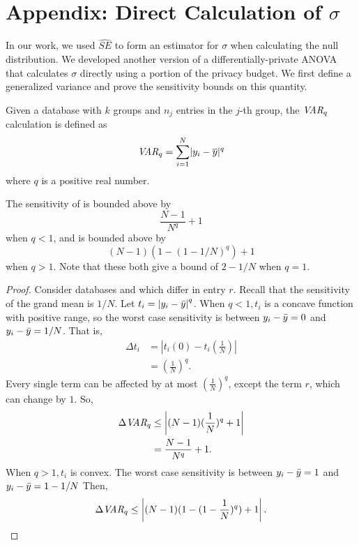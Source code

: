 
\section{Appendix: Direct Calculation of $\sigma$}
\label{Sec:AppDirSig}

In our work, we used $\widehat{SE}$ to form an estimator for $\sigma$ when calculating the null distribution.  We developed another version of a differentially-private ANOVA that calculates $\sigma$ directly using a portion of the privacy budget.  We first define a generalized variance and prove the sensitivity bounds on this quantity.

\begin{definition}[$\var_q$] \label{def:varq} Given a database \x with $k$ groups and $n_j$ entries in the $j$-th group, the $\var_q$ calculation is defined as
\begin{equation*}
\textit{VAR}_q = \sum_{i=1}^N \lvert y_{i} - \overline{y} \rvert^q
\end{equation*}
where $q$ is a positive real number.
\end{definition}

\begin{theorem} \label{thm:varqSens} 
The sensitivity of \varq is bounded above by
$$ \frac{N-1}{N^q} + 1 $$
when $q<1$, and is bounded above by
$$ (N-1)(1-(1-1/N)^q) + 1 $$
when $q>1$. Note that these both give a bound of $2-1/N$ when $q=1$.
\end{theorem}

\begin{proof}
Consider databases \x and \xprime which differ in entry $r$. Recall that the sensitivity of the grand mean is $1/N$. Let $t_i = \left\vert  y_i - \bar{y} \right\vert ^q$. When $q<1, t_i$ is a concave function with positive range, so the worst case sensitivity is between $ y_i - \bar{y} = 0$ and $ y_i - \bar{y} = 1/N$. That is, 
\begin{align*}
\Delta t_i &= \left\vert t_{i}(0) - t_i\left(\frac{1}{N}\right) \right\vert \\
	&= \left( \frac{1}{N} \right)^q.
\end{align*}
%
Every single term can be affected by at most $\left( \frac{1}{N} \right)^q$, except the term $r$, which can change by $1$. So, 
\begin{align*}
\Delta \textit{VAR}_q &\le \left\vert (N-1)(\frac{1}{N})^q + 1 \right\vert \\
	&= \frac{N-1}{N^q} + 1.
\end{align*}
%
When $q>1, t_i$ is convex. The worst case sensitivity is between  $y_i - \bar{y} = 1$ and $y_i - \bar{y} = 1-1/N$ Then,
\begin{align*}
\Delta \textit{VAR}_q \le \left\vert (N-1)(1-(1-\frac{1}{N})^q) + 1 \right\vert.
\end{align*}
\end{proof}

